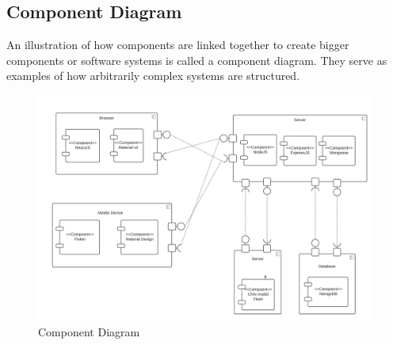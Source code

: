 \subsection{Component Diagram}
An illustration of how components are linked together to create bigger components or software systems is called a component diagram. They serve as examples of how arbitrarily complex systems are structured.

\begin{figure}[H]
\begin{center}
\includegraphics[width=18cm]{./diagnosis-system/conception/component.png}
\end{center}
\caption{Component Diagram}
\label{fig:}
\end{figure}

    
